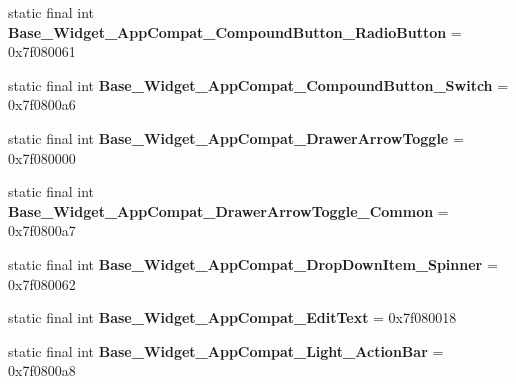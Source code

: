 \begin{DoxyCompactItemize}
\item 
\hypertarget{classandroid_1_1support_1_1design_1_1_r_1_1style_ab596edf2643e391425f1a469e69ce390}{}static final int {\bfseries Base\+\_\+\+Widget\+\_\+\+App\+Compat\+\_\+\+Compound\+Button\+\_\+\+Radio\+Button} = 0x7f080061\label{classandroid_1_1support_1_1design_1_1_r_1_1style_ab596edf2643e391425f1a469e69ce390}

\item 
\hypertarget{classandroid_1_1support_1_1design_1_1_r_1_1style_ad527149587e3b47f9834113f439d22c2}{}static final int {\bfseries Base\+\_\+\+Widget\+\_\+\+App\+Compat\+\_\+\+Compound\+Button\+\_\+\+Switch} = 0x7f0800a6\label{classandroid_1_1support_1_1design_1_1_r_1_1style_ad527149587e3b47f9834113f439d22c2}

\item 
\hypertarget{classandroid_1_1support_1_1design_1_1_r_1_1style_a457e1838a15856d10a8d12c916773ba4}{}static final int {\bfseries Base\+\_\+\+Widget\+\_\+\+App\+Compat\+\_\+\+Drawer\+Arrow\+Toggle} = 0x7f080000\label{classandroid_1_1support_1_1design_1_1_r_1_1style_a457e1838a15856d10a8d12c916773ba4}

\item 
\hypertarget{classandroid_1_1support_1_1design_1_1_r_1_1style_a93cedb930ccfa6cadef1eb29de1a73b7}{}static final int {\bfseries Base\+\_\+\+Widget\+\_\+\+App\+Compat\+\_\+\+Drawer\+Arrow\+Toggle\+\_\+\+Common} = 0x7f0800a7\label{classandroid_1_1support_1_1design_1_1_r_1_1style_a93cedb930ccfa6cadef1eb29de1a73b7}

\item 
\hypertarget{classandroid_1_1support_1_1design_1_1_r_1_1style_ac59d3c95c31fbc0c8a6c60261592935e}{}static final int {\bfseries Base\+\_\+\+Widget\+\_\+\+App\+Compat\+\_\+\+Drop\+Down\+Item\+\_\+\+Spinner} = 0x7f080062\label{classandroid_1_1support_1_1design_1_1_r_1_1style_ac59d3c95c31fbc0c8a6c60261592935e}

\item 
\hypertarget{classandroid_1_1support_1_1design_1_1_r_1_1style_ac849b9e899a3938f5c47c1e3c4d9d907}{}static final int {\bfseries Base\+\_\+\+Widget\+\_\+\+App\+Compat\+\_\+\+Edit\+Text} = 0x7f080018\label{classandroid_1_1support_1_1design_1_1_r_1_1style_ac849b9e899a3938f5c47c1e3c4d9d907}

\item 
\hypertarget{classandroid_1_1support_1_1design_1_1_r_1_1style_af936e54423ddc9b9176aef1004342be3}{}static final int {\bfseries Base\+\_\+\+Widget\+\_\+\+App\+Compat\+\_\+\+Light\+\_\+\+Action\+Bar} = 0x7f0800a8\label{classandroid_1_1support_1_1design_1_1_r_1_1style_af936e54423ddc9b9176aef1004342be3}


\end{DoxyCompactItemize}

